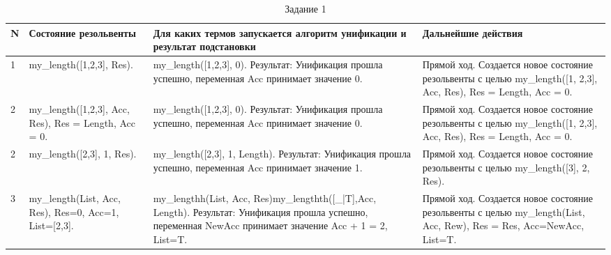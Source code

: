 \documentclass[a4paper,14pt, unknownkeysallowed]{extreport}
\begin{document}
\begin{table}[]
	\centering
	\caption{Задание 1}
	\label{task1}
	\begin{tabular}{|p{0.8cm}|p{4cm}|p{7.5cm}|p{4cm}|}
		\hline
		\textbf{N} & \textbf{Состояние резольвенты} & \textbf{Для каких термов запускается алгоритм унификации и результат подстановки} & \textbf{Дальнейшие действия} \\ 
		\hline
		1 & my\_length([1,2,3], Res). & my\_length([1,2,3], 0). Результат: Унификация прошла успешно, переменная Acc принимает значение 0. & Прямой ход. Создается новое состояние резольвенты с целью my\_length([1, 2,3], Acc, Res), Res = Length, Acc = 0. \\
		\hline
		2 & my\_length([1,2,3], Acc, Res), Res = Length, Acc = 0. & my\_length([1,2,3], 0). Результат: Унификация прошла успешно, переменная Acc принимает значение 0. & Прямой ход. Создается новое состояние резольвенты с целью my\_length([1, 2,3], Acc, Res), Res = Length, Acc = 0. \\
		\hline
		2 & my\_length([2,3], 1, Res). & my\_length([2,3], 1, Length). Результат: Унификация прошла успешно, переменная Acc принимает значение 1. & Прямой ход. Создается новое состояние резольвенты с целью my\_length([3], 2, Res). \\
		\hline
		3 & my\_length(List, Acc, Res), Res=0, Acc=1, List=[2,3]. &my\_lengthh(List, Acc, Res)my\_lengthth([\_|T],Acc, Length). Результат: Унификация прошла успешно, переменная NewAcc принимает значение Acc + 1 = 2, List=T. & Прямой ход. Создается новое состояние резольвенты с целью my\_length(List, Acc, Rew), Res = Res, Acc=NewAcc, List=T. \\
		\hline
		
	\end{tabular}
\end{table}
\end{document}
